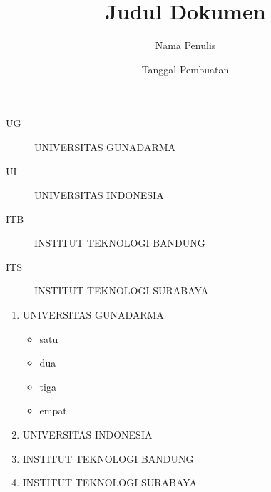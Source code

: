 \documentclass [a4paper,12pt] {report}
\begin{document}
\title{Judul Dokumen}
\author{Nama Penulis}
\date{Tanggal Pembuatan}


\begin{description}
\item [ UG ] UNIVERSITAS GUNADARMA
\item [ UI ] UNIVERSITAS INDONESIA
\item [ ITB ] INSTITUT TEKNOLOGI BANDUNG
\item [ ITS] INSTITUT TEKNOLOGI SURABAYA
\end{description}

\begin{enumerate}
\item UNIVERSITAS GUNADARMA
	\begin{itemize}
	\item satu
	\item dua
	\item tiga
	\item empat
\end{itemize}
\item UNIVERSITAS INDONESIA
\item INSTITUT TEKNOLOGI BANDUNG
\item INSTITUT TEKNOLOGI SURABAYA
\end{enumerate}
\end{document}
